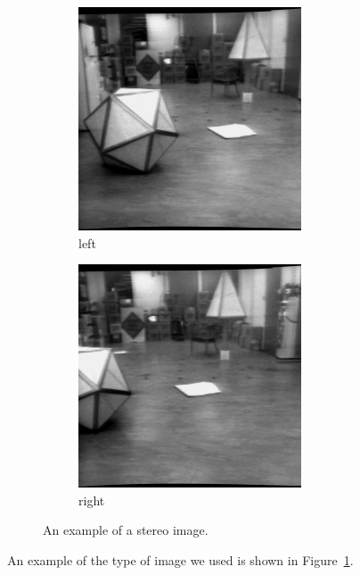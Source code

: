 \documentclass[10pt,twoside,titlepage]{article}
\begin{document}
\begin{figure}
    \centering
    \begin{subfigure}{0.5\textwidth}
        \centering
        \includegraphics[width=0.6\linewidth]{cart_orig_left.png}
        \caption{left}
    \end{subfigure}%
    \begin{subfigure}{0.5\textwidth}
        \centering
        \includegraphics[width=0.6\linewidth]{cart_orig_right.png}
        \caption{right}
    \end{subfigure}
    \caption{An example of a stereo image.}
    \label{fig:cart_orig}
\end{figure}

An example of the type of image we used is shown in Figure~\ref{fig:cart_orig}.
\end{document}
